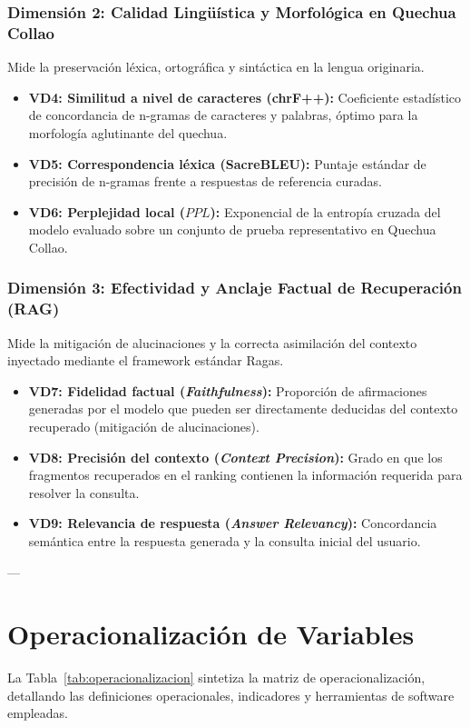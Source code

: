 \documentclass[12pt]{article}
\begin{document}
\subsubsection{Dimensión 2: Calidad Lingüística y Morfológica en Quechua Collao}
Mide la preservación léxica, ortográfica y sintáctica en la lengua originaria.
\begin{itemize}
    \item \textbf{VD4: Similitud a nivel de caracteres (chrF++):} Coeficiente estadístico de concordancia de n-gramas de caracteres y palabras, óptimo para la morfología aglutinante del quechua.
    \item \textbf{VD5: Correspondencia léxica (SacreBLEU):} Puntaje estándar de precisión de n-gramas frente a respuestas de referencia curadas.
    \item \textbf{VD6: Perplejidad local ($PPL$):} Exponencial de la entropía cruzada del modelo evaluado sobre un conjunto de prueba representativo en Quechua Collao.
\end{itemize}

\subsubsection{Dimensión 3: Efectividad y Anclaje Factual de Recuperación (RAG)}
Mide la mitigación de alucinaciones y la correcta asimilación del contexto inyectado mediante el framework estándar Ragas.
\begin{itemize}
    \item \textbf{VD7: Fidelidad factual (\textit{Faithfulness}):} Proporción de afirmaciones generadas por el modelo que pueden ser directamente deducidas del contexto recuperado (mitigación de alucinaciones).
    \item \textbf{VD8: Precisión del contexto (\textit{Context Precision}):} Grado en que los fragmentos recuperados en el ranking contienen la información requerida para resolver la consulta.
    \item \textbf{VD9: Relevancia de respuesta (\textit{Answer Relevancy}):} Concordancia semántica entre la respuesta generada y la consulta inicial del usuario.
\end{itemize}

---

\section{Operacionalización de Variables}
La Tabla~\ref{tab:operacionalizacion} sintetiza la matriz de operacionalización, detallando las definiciones operacionales, indicadores y herramientas de software empleadas.
\end{document}
